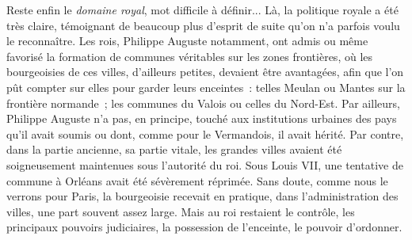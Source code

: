 \documentclass[french,twoside]{book} %
\begin{document}
Reste enfin le \emph{domaine royal}, mot difficile à définir... Là, la politique royale a été très claire, témoignant de beaucoup plus d’esprit de suite qu’on n’a parfois voulu le reconnaître. Les rois, Philippe Auguste notamment, ont admis ou même favorisé la formation de communes véritables sur les zones frontières, où les bourgeoisies de ces villes, d’ailleurs petites, devaient être avantagées, afin que l’on pût compter sur elles pour garder leurs enceintes : telles Meulan ou Mantes sur la frontière normande ; les communes du Valois ou celles du Nord-Est. Par ailleurs, Philippe Auguste n’a pas, en principe, touché aux institutions urbaines des pays qu’il avait soumis ou dont, comme pour le Vermandois, il avait hérité. Par contre, dans la partie ancienne, sa partie vitale, les grandes villes avaient été soigneusement maintenues sous l’autorité du roi. Sous Louis VII, une tentative de commune à Orléans avait été sévèrement réprimée. Sans doute, comme nous le verrons pour Paris, la bourgeoisie recevait en pratique, dans l’administration des villes, une part souvent assez large. Mais au roi restaient le contrôle, les principaux pouvoirs judiciaires, la possession de l’enceinte, le pouvoir d’ordonner.
\end{document}
